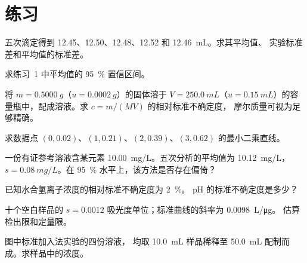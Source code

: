 \section{练习}

\begin{exercise}[$\star$]\label{exo:b2:measurement-statistics:1}
五次滴定得到 12.45、12.50、12.48、12.52 和 \qty{12.46}{mL}。求其平均值、
实验标准差和平均值的标准差。
\end{exercise}

\begin{exercise}[$\star$]\label{exo:b2:measurement-statistics:2}
求练习~1 中平均值的 95~\% 置信区间。
\end{exercise}

\begin{exercise}[$\star$]\label{exo:b2:measurement-statistics:3}
将 $m = \qty{0.5000}{g}$（$u = \qty{0.0002}{g}$）的固体溶于
$V = \qty{250.0}{mL}$（$u = \qty{0.15}{mL}$）的容量瓶中，配成溶液。求 $c = m/(MV)$ 的相对标准不确定度，
摩尔质量可视为足够精确。
\end{exercise}

\begin{exercise}[$\star$]\label{exo:b2:measurement-statistics:4}
求数据点 $(0, 0.02)$、$(1, 0.21)$、$(2, 0.39)$、$(3, 0.62)$ 的最小二乘直线。
\end{exercise}

\begin{exercise}[$\star\star$]\label{exo:b2:measurement-statistics:5}
一份有证参考溶液含某元素 \qty{10.00}{mg/L}。五次分析的平均值为
\qty{10.12}{mg/L}，$s = \qty{0.08}{mg/L}$。在 95~\% 水平上，该方法是否存在偏倚？
\end{exercise}

\begin{exercise}[$\star\star$]\label{exo:b2:measurement-statistics:6}
已知水合氢离子浓度的相对标准不确定度为 2~\%。
pH 的标准不确定度是多少？
\end{exercise}

\begin{exercise}[$\star\star$]\label{exo:b2:measurement-statistics:7}
十个空白样品的 $s = 0.0012$ 吸光度单位；标准曲线的斜率为 \qty{0.0098}{L/\micro g}。
估算检出限和定量限。
\end{exercise}

\begin{exercise}[$\star\star$]\label{exo:b2:measurement-statistics:8}
图中标准加入法实验的四份溶液，
均取 \qty{10.0}{mL} 样品稀释至 \qty{50.0}{mL} 配制而成。求样品中的浓度。
\end{exercise}

